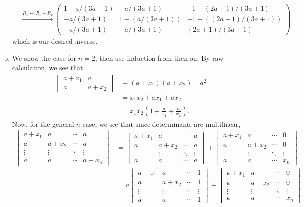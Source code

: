 \documentclass[10pt]{mypackage}
\begin{document}
\begin{solution}
\begin{enumerate}[(a)]
\begin{align*}
                         &\xrightarrow{R_1 \leftarrow R_1 + R_2} \begin{pmatrix}1-a/(3a+1) & -a/(3a+1) & -1 + (2a+1)/(3a+1) \\ -a/(3a+1) & 1-\left( a/(3a+1) \right) & -1 + \left( (2a+1)/(3a+1) \right)\\ -a/(3a+1) & -a/(3a+1) & (2a+1)/(3a+1)\end{pmatrix},
      \end{align*}
      which is our desired inverse.
    \item We show the case for $n=2$, then use induction from then on. By raw calculation, we see that
      \begin{align*}
        \begin{vmatrix}a + x_1 & a \\ a & a + x_2\end{vmatrix} &= \left( a+x_1 \right)\left( a+x_2 \right)-a^2\\
                               &= x_1x_2 + ax_1 + ax_2\\
                               &= x_1x_2\left( 1 + \frac{a}{x_1} + \frac{a}{x_2} \right).
      \end{align*}
      Now, for the general $n$ case, we see that since determinants are multilinear,
      \begin{align*}
        \begin{vmatrix}a + x_1 & a & \cdots & a \\ a & a + x_2 & \cdots & a \\ \vdots & \vdots & \ddots & \vdots \\ a & a & \cdots & a + x_n\end{vmatrix} &= \begin{vmatrix}a + x_1 & a & \cdots & a \\ a & a + x_2 & \cdots & a \\ \vdots & \vdots & \ddots & \vdots \\ a & a & \cdots & a\end{vmatrix} + \begin{vmatrix}a + x_1 & a & \cdots & 0 \\ a & a + x_2 & \cdots & 0 \\ \vdots & \vdots & \ddots & \vdots \\ a & a & \cdots & x_n\end{vmatrix}\\
                               &= a\begin{vmatrix}a + x_1 & a & \cdots & 1 \\ a & a + x_2 & \cdots & 1 \\ \vdots & \vdots & \ddots & \vdots \\ a & a & \cdots & 1\end{vmatrix} + \begin{vmatrix}a + x_1 & a & \cdots & 0 \\ a & a + x_2 & \cdots & 0 \\ \vdots & \vdots & \ddots & \vdots \\ a & a & \cdots & x_n\end{vmatrix}

\end{align*}
\end{enumerate}
\end{solution}
\end{document}
